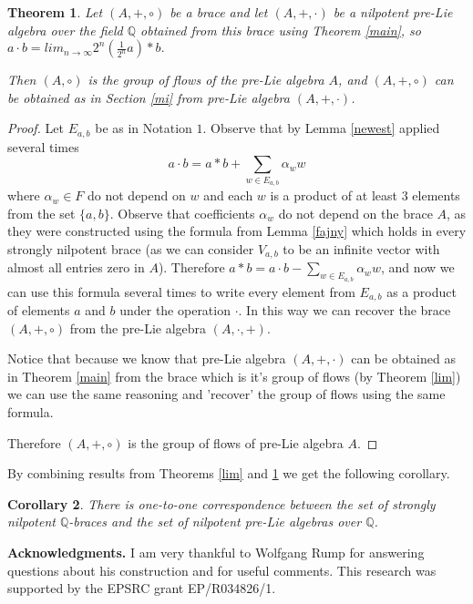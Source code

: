 \documentclass[12pt]{article}
\newtheorem{theorem}{Theorem}
\newtheorem{corollary}[theorem]{Corollary}
\begin{document}
\begin{theorem}\label{5}
 Let $(A, +, \circ )$ be a brace and let $(A, +, \cdot )$ be a nilpotent  pre-Lie algebra over the field $\mathbb Q$ 
 obtained from this brace using Theorem \ref{main}, so $a\cdot b=lim_{n\rightarrow \infty}2^{n} ({\frac 1{2^{n}}}a)*b.$
 
 Then $(A, \circ)$ is the group of flows of the pre-Lie algebra $A$, and  $(A, +,  \circ )$ can be obtained as in 
 Section \ref{mi} from pre-Lie algebra $(A, +, \cdot )$.
\end{theorem}
\begin{proof} Let $E_{a,b}$ be as in Notation $1$. 
 Observe that by Lemma \ref{newest} applied several times 
\[a\cdot  b=a* b +\sum_{w\in E_{a,b}}\alpha _{w}w\] where 
$\alpha _{w}\in F$ do not depend on $w$ and each $w$ is a product of at least $3$ elements from the set $\{a, b\}$. Observe that coefficients $\alpha _{w}$ do not  depend on the brace $A$, as they were constructed using the formula from Lemma \ref{fajny} which holds in every strongly nilpotent brace (as we can consider $V_{a, b}$ to be an infinite vector with almost all entries zero in $A$).
 Therefore $a*b=a\cdot b-\sum_{w\in E_{a,b}}\alpha _{w}w$, and now we can use this formula several times  to write every element from $E_{a,b}$ as a product of elements $a$ and $b$ under the operation $\cdot $.
 In this way we can recover the brace $(A,  +, \circ )$ from  the pre-Lie algebra $(A, \cdot , +)$. 

Notice that because we know that pre-Lie algebra $(A, +, \cdot )$ can be obtained as in Theorem \ref{main} from the brace which is it's group of flows (by Theorem \ref{lim})     
 we can use the same reasoning and 'recover' the group of flows using the same formula.

Therefore $(A, +, \circ)$ is the group of flows of pre-Lie algebra $A$. 
\end{proof}



By combining results from Theorems \ref{lim} and \ref{5} we get the following corollary.

\begin{corollary}
 There is one-to-one correspondence between the set of strongly nilpotent $\mathbb Q$-braces and the set  of  nilpotent pre-Lie algebras over $\mathbb Q$.
\end{corollary}


{\bf Acknowledgments.} I am  very thankful to Wolfgang Rump for  answering questions about his construction and for useful comments. This research was supported by the EPSRC grant EP/R034826/1.
\end{document}
